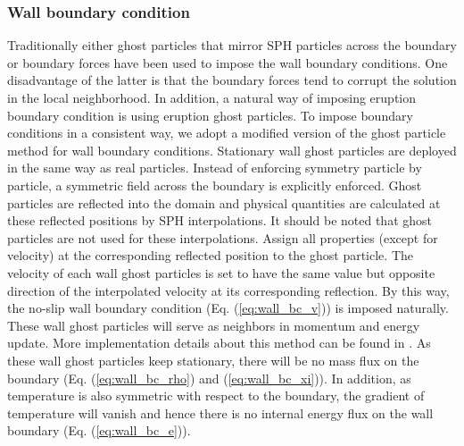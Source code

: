 \documentclass[journal abbreviation, manuscript]{copernicus}
\begin{document}
\subsubsection{Wall boundary condition}
Traditionally either ghost particles that mirror SPH particles across the boundary \citep {ferrari2009new} or boundary forces \citep {monaghan2009sph} have been used to impose the wall boundary conditions. One disadvantage of the latter  is that the boundary forces tend to corrupt the solution in the local neighborhood. In addition, a natural way of imposing eruption boundary condition is using eruption ghost particles. To impose boundary conditions in a consistent way, we adopt a modified version of the ghost particle method \citep {kumar2013parallel} for wall boundary conditions. Stationary wall ghost particles are deployed in the same way as real particles. Instead of enforcing symmetry particle by particle, a symmetric field across the boundary is explicitly enforced. Ghost particles are reflected into the domain and physical quantities are calculated at these reflected positions by SPH interpolations. It should be noted that ghost particles are not used for these interpolations. Assign all properties (except for velocity) at the corresponding reflected position to the ghost particle. The velocity of each wall ghost particles is set to have the same value but opposite direction of the interpolated velocity at its corresponding reflection. By this way, the no-slip wall boundary condition (Eq. (\ref{eq:wall_bc_v})) is imposed naturally. These wall ghost particles will serve as neighbors in momentum and energy update. More implementation details about this method can be found in \citep {kumar2013parallel}. As these wall ghost particles keep stationary, there will be no mass flux on the boundary (Eq. (\ref{eq:wall_bc_rho}) and (\ref{eq:wall_bc_xi})). In addition, as temperature is also symmetric with respect to the boundary, the gradient of temperature will vanish and hence there is no internal energy flux on the wall boundary (Eq. (\ref{eq:wall_bc_e})). 
\end{document}
